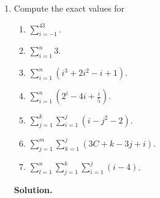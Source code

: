 \documentclass[9pt]{article}
\newcommand{\D}{\displaystyle}
\begin{document}
\begin{enumerate}
   \item Compute the exact values for

         \begin{enumerate}
            \item $\D\sum_{i=-1}^43$.
            \item $\D\sum_{i=1}^n3$.
            \item $\D\sum_{i=1}^n (i^3 + 2i^2 - i + 1)$.
            \item $\D\sum_{i=1}^n \left(2^i - 4i + \frac{i}{5}\right)$.
            \item $\D\sum_{j=1}^k\sum_{i=1}^j (i - j^2 - 2)$.
            \item $\D\sum_{j=1}^m\sum_{k=1}^j (3C + k - 3j + i)$.
            \item $\D\sum_{l=1}^n\sum_{j=1}^k\sum_{i=1}^j (i - 4)$.
         \end{enumerate}
      
      \textbf{Solution.} 


\end{enumerate}
\end{document}
